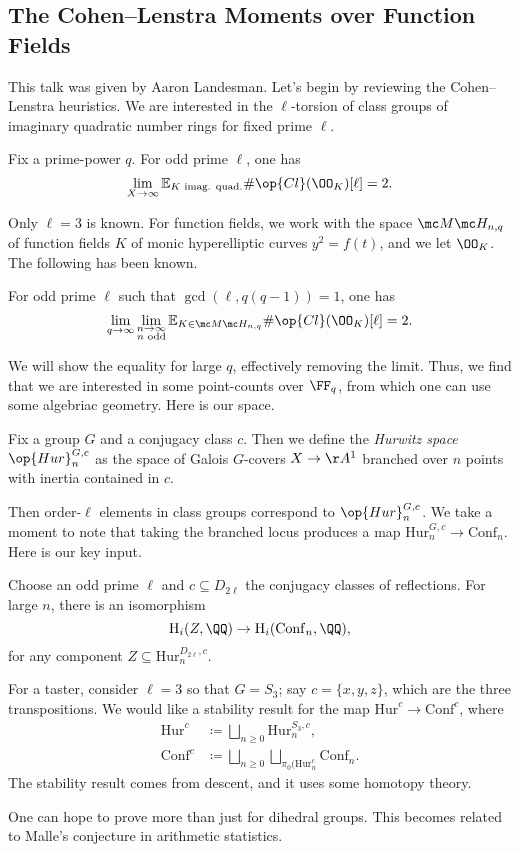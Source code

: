 \documentclass{article}
\begin{document}
\subsection{The Cohen--Lenstra Moments over Function Fields}
This talk was given by Aaron Landesman. Let's begin by reviewing the Cohen--Lenstra heuristics. We are interested in the $\ell$-torsion of class groups of imaginary quadratic number rings for fixed prime $\ell$.
\begin{conj}
	Fix a prime-power $q$. For odd prime $\ell$, one has
	\[\lim_{X\to\infty}\mathbb E_{K\text{ imag. quad.}}\#\op{Cl}(\OO_K)[\ell]=2.\]
\end{conj}
Only $\ell=3$ is known. For function fields, we work with the space $\mc M\mc H_{n,q}$ of function fields $K$ of monic hyperelliptic curves $y^2=f(t)$, and we let $\OO_K$. The following has been known.
\begin{theorem}
	For odd prime $\ell$ such that $\gcd(\ell,q(q-1))=1$, one has
	\[\lim_{q\to\infty}\lim_{\substack{n\to\infty\\n\text{ odd}}}\mathbb E_{K\in\mc M\mc H_{n,q}}\#\op{Cl}(\OO_K)[\ell]=2.\]
\end{theorem}
We will show the equality for large $q$, effectively removing the limit. Thus, we find that we are interested in some point-counts over $\FF_q$, from which one can use some algebriac geometry. Here is our space.
\begin{definition}
	Fix a group $G$ and a conjugacy class $c$. Then we define the \textit{Hurwitz space} $\op{Hur}_n^{G,c}$ as the space of Galois $G$-covers $X\to\AA^1$ branched over $n$ points with inertia contained in $c$.
\end{definition}
Then order-$\ell$ elements in class groups correspond to $\op{Hur}_n^{G,c}$. We take a moment to note that taking the branched locus produces a map $\mathrm{Hur}_n^{G,c}\to\mathrm{Conf}_n$. Here is our key input.
\begin{theorem}
	Choose an odd prime $\ell$ and $c\subseteq D_{2\ell}$ the conjugacy classes of reflections. For large $n$, there is an isomorphism
	\[\mathrm H_i(Z,\QQ)\to\mathrm H_i(\mathrm{Conf}_n,\QQ),\]
	for any component $Z\subseteq\mathrm{Hur}_n^{D_{2\ell},c}$.
\end{theorem}
For a taster, consider $\ell=3$ so that $G=S_3$; say $c=\{x,y,z\}$, which are the three transpositions. We would like a stability result for the map $\mathrm{Hur}^c\to\mathrm{Conf}^c$, where
\begin{align*}
	\mathrm{Hur}^c &\coloneqq\bigsqcup_{n\ge0}\mathrm{Hur}_n^{S_3,c}, \\
	\mathrm{Conf}^c &\coloneqq\bigsqcup_{n\ge0}\bigsqcup_{\pi_0(\mathrm{Hur}_n^c}\mathrm{Conf}_n.
\end{align*}
The stability result comes from descent, and it uses some homotopy theory.
\begin{remark}
	One can hope to prove more than just for dihedral groups. This becomes related to Malle's conjecture in arithmetic statistics.
\end{remark}
\end{document}
